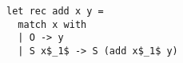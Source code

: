 \begin{figure}[!t]
  \centering
  \begin{minipage}{\columnwidth}
    \begin{lstlisting}[frame=tb]
let rec add x y =
  match x with
  | O -> y
  | S x$_1$ -> S (add x$_1$ y)
    \end{lstlisting}
  \end{minipage}
\end{figure}